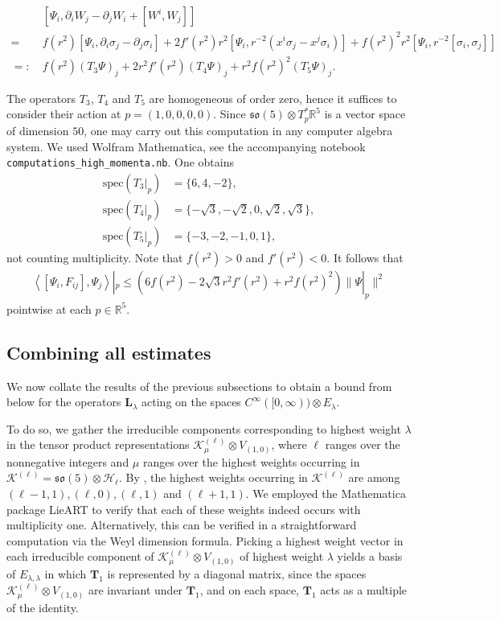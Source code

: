 \documentclass[11pt,reqno]{amsart}
\theoremstyle{remark}
\theoremstyle{definition}
\newcommand{\sov}{\mathfrak{so}(5)}
\begin{document}
\begin{align*}
    &[\Psi_i, \partial_iW_j-\partial_j W_i+[W^i,W_j]] \\
    = 
     \ &f(r^2) [\Psi_i, \partial_i \sigma_j - \partial_j \sigma_i] + 
    2 f'(r^2) r^2 [\Psi_i, r^{-2} \left( x^i \sigma_j - x^j \sigma_i \right)] + f(r^2)^2 r^2 [\Psi_i, r^{-2}[\sigma_i,\sigma_j]] \\
    =: \ & f(r^2) (T_3 \Psi)_j + 
    2 r^2 f'(r^2) (T_4 \Psi)_j + r^2 f(r^2)^2(T_5 \Psi)_j.
\end{align*}

The operators $T_3$, $T_4$ and $T_5$ are homogeneous of order zero, hence it suffices to consider their action at $p = (1,0,0,0,0)$. Since $\sov \otimes T^\ast_{p} \mathbb R^5$ is a vector space of dimension $50$, one may carry out this computation in any computer algebra system. We used Wolfram Mathematica, see the accompanying notebook \texttt{computations\_high\_momenta.nb}. One obtains 
\begin{align*}
    \mathrm{spec}(T_3|_p) &= \{6,4,-2\}, \\
    \mathrm{spec}(T_4|_p) &= \{-\sqrt{3},-\sqrt{2},0,\sqrt{2},\sqrt{3}\}, \\
    \mathrm{spec}(T_5|_p) &= \{-3,-2,-1,0,1\},
\end{align*}
not counting multiplicity. Note that $f(r^2) > 0$ and $f'(r^2) < 0$. It follows that
\begin{align*}
    \left\langle [\Psi_i, F_{ij}] , \Psi_j \right\rangle|_p \leq \left(6 f(r^2) - 2 \sqrt{3} r^2 f'(r^2) + r^2 f(r^2)^2\right) \| \Psi|_p \|^2
\end{align*}
pointwise at each $p \in \mathbb R^5$.

\subsection{Combining all estimates}

We now collate the results of the previous subsections to obtain a bound from below for the operators $\mathbf L_\lambda$ acting on the spaces $C^\infty([0,\infty)) \otimes E_\lambda$.

To do so, we gather the irreducible components corresponding to highest weight $\lambda$ in the tensor product representations $\mathcal K_\mu^{(\ell)} \otimes V_{(1,0)}$, where $\ell$ ranges over the nonnegative integers and $\mu$ ranges over the highest weights occurring in $\mathcal K^{(\ell)} = \sov \otimes \mathcal H_\ell$. By , the highest weights occurring in $\mathcal K^{(\ell)}$ are among $(\ell-1,1),(\ell,0),(\ell,1)$ and $(\ell+1,1)$. We employed the Mathematica package LieART \cite{LieART} to verify that each of these weights indeed occurs with multiplicity one. Alternatively, this can be verified in a straightforward computation via the Weyl dimension formula.
Picking a highest weight vector in each irreducible component of $\mathcal K_\mu^{(\ell)} \otimes V_{(1,0)}$ of highest weight $\lambda$ yields a basis of $E_{\lambda,\lambda}$ in which $\mathbf T_1$ is represented by a diagonal matrix, since the spaces $\mathcal K_\mu^{(\ell)} \otimes V_{(1,0)}$ are invariant under $\mathbf T_1$, and on each space, $\mathbf T_1$ acts as a multiple of the identity.
\end{document}
